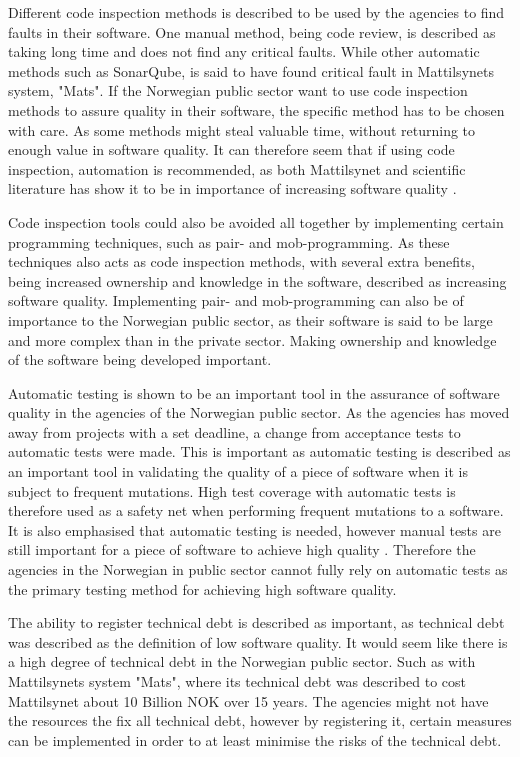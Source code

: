 Different code inspection methods is described to be used by the agencies to find faults in their software. One manual method, being code review, is described as taking long time and does not find any critical faults. While other automatic methods such as SonarQube, is said to have found critical fault in Mattilsynets system, "Mats". If the Norwegian public sector want to use code inspection methods to assure quality in their software, the specific method has to be chosen with care. As some methods might steal valuable time, without returning to enough value in software quality. It can therefore seem that if using code inspection, automation is recommended, as both Mattilsynet and scientific literature has show it to be in importance of increasing software quality \cite{smm_2018}.

Code inspection tools could also be avoided all together by implementing certain programming techniques, such as pair- and mob-programming. As these techniques also acts as code inspection methods, with several extra benefits, being increased ownership and knowledge in the software, described as increasing software quality. Implementing pair- and mob-programming can also be of importance to the Norwegian public sector, as their software is said to be large and more complex than in the private sector. Making ownership and knowledge of the software being developed important.

Automatic testing is shown to be an important tool in the assurance of software quality in the agencies of the Norwegian public sector. As the agencies has moved away from projects with a set deadline, a change from acceptance tests to automatic tests were made. This is important as automatic testing is described as an important tool in validating the quality of a piece of software when it is subject to frequent mutations. High test coverage with automatic tests is therefore used as a safety net when performing frequent mutations to a software. It is also emphasised that automatic testing is needed, however manual tests are still important for a piece of software to achieve high quality \cite{dsc_2019}. Therefore the agencies in the Norwegian in public sector cannot fully rely on automatic tests as the primary testing method for achieving high software quality.

The ability to register technical debt is described as important, as technical debt was described as the definition of low software quality. It would seem like there is a high degree of technical debt in the Norwegian public sector. Such as with Mattilsynets system "Mats", where its technical debt was described to cost Mattilsynet about 10 Billion NOK over 15 years. The agencies might not have the resources the fix all technical debt, however by registering it, certain measures can be implemented in order to at least minimise the risks of the technical debt.

